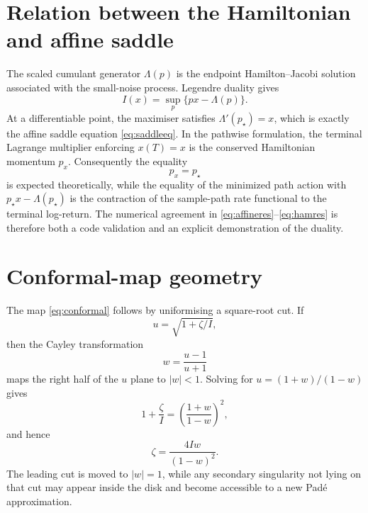 \documentclass[11pt]{article}
\begin{document}
\section{Relation between the Hamiltonian and affine saddle}
The scaled cumulant generator $\Lambda(p)$ is the endpoint Hamilton--Jacobi solution associated with the small-noise process. Legendre duality gives
\begin{equation}
 I(x)=\sup_p\{px-\Lambda(p)\}.
\end{equation}
At a differentiable point, the maximiser satisfies $\Lambda'(p_\star)=x$, which is exactly the affine saddle equation \eqref{eq:saddleeq}. In the pathwise formulation, the terminal Lagrange multiplier enforcing $x(T)=x$ is the conserved Hamiltonian momentum $p_x$. Consequently the equality
\begin{equation}
 p_x=p_\star
\end{equation}
is expected theoretically, while the equality of the minimized path action with $p_\star x-\Lambda(p_\star)$ is the contraction of the sample-path rate functional to the terminal log-return. The numerical agreement in \eqref{eq:affineres}--\eqref{eq:hamres} is therefore both a code validation and an explicit demonstration of the duality.

\section{Conformal-map geometry}
The map \eqref{eq:conformal} follows by uniformising a square-root cut. If
\begin{equation}
 u=\sqrt{1+\zeta/I},
\end{equation}
then the Cayley transformation
\begin{equation}
 w=\frac{u-1}{u+1}
\end{equation}
maps the right half of the $u$ plane to $|w|<1$. Solving for $u=(1+w)/(1-w)$ gives
\begin{equation}
 1+\frac{\zeta}{I}=\left(\frac{1+w}{1-w}\right)^2,
\end{equation}
and hence
\begin{equation}
 \zeta=\frac{4Iw}{(1-w)^2}.
\end{equation}
The leading cut is moved to $|w|=1$, while any secondary singularity not lying on that cut may appear inside the disk and become accessible to a new Pad\'e approximation.
\end{document}
